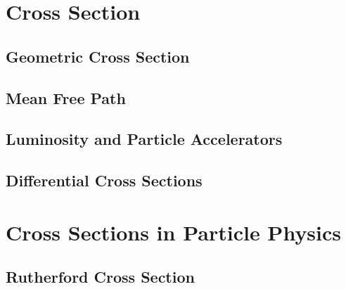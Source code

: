 \documentclass[../qm.tex]{subfiles}
\begin{document}
\section{Cross Section}
\subsection{Geometric Cross Section}
\subsection{Mean Free Path}
\subsection{Luminosity and Particle Accelerators}
\subsection{Differential Cross Sections}
\section{Cross Sections in Particle Physics}
\subsection{Rutherford Cross Section}
\end{document}
